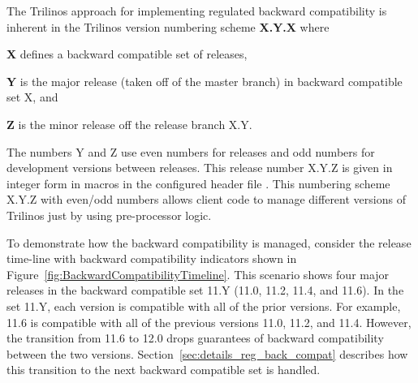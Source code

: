 \documentclass[11pt]{SANDreport}
\begin{document}
The Trilinos approach for implementing regulated backward
compatibility is inherent in the Trilinos version numbering scheme
{}\textbf{X.Y.X} where
%
\begin{compactitem}
%
{}\item\textbf{X} defines a backward compatible set of releases,
%
{}\item\textbf{Y} is the major release (taken off of the master
branch) in backward compatible set X, and
%
{}\item\textbf{Z} is the minor release off the release branch X.Y.
%
\end{compactitem}

\begin{floatingfigure}[r]{0.5\textwidth}
\begin{center}
\end{center}
\end{floatingfigure}

The numbers Y and Z use even numbers for releases and odd numbers for
development versions between releases.  This release number X.Y.Z is
given in integer form in macros in the configured header file
{}.  This numbering scheme X.Y.Z with
even/odd numbers allows client code to manage different versions of
Trilinos just by using pre-processor logic.

To demonstrate how the backward compatibility is managed, consider the
release time-line with backward compatibility indicators shown in
Figure~\ref{fig:BackwardCompatibilityTimeline}.  This scenario shows
four major releases in the backward compatible set 11.Y (11.0, 11.2,
11.4, and 11.6).  In the set 11.Y, each version is compatible with all
of the prior versions.  For example, 11.6 is compatible with all of
the previous versions 11.0, 11.2, and 11.4.  However, the transition
from 11.6 to 12.0 drops guarantees of backward compatibility between
the two versions.  Section~\ref{sec:details_reg_back_compat} describes
how this transition to the next backward compatible set is handled.
\end{document}

